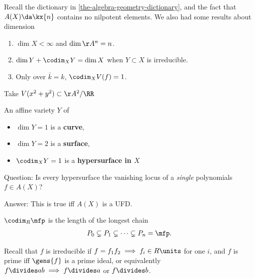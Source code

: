 Recall the dictionary in \cref{the-algebra-geometry-dictionary}, and the
fact that \(A(X) \da \kx{n}\) contains no nilpotent elements. We also
had some results about dimension

\begin{enumerate}
\def\labelenumi{\arabic{enumi}.}
\tightlist
\item
  \(\dim X<\infty\) and \(\dim \AA^n = n\).
\item
  \(\dim Y + \codim_X Y = \dim X\) when \(Y\subset X\) is irreducible.
\item
  Only over \(\bar k = k\), \(\codim_X V(f) = 1\).
\end{enumerate}

\begin{example}

Take \(V(x^2+y^2) \subset \AA^2/\RR\)

\end{example}

\begin{definition}

An affine variety \(Y\) of

\begin{itemize}
\tightlist
\item
  \(\dim Y = 1\) is a \textbf{curve},
\item
  \(\dim Y = 2\) is a \textbf{surface},
\item
  \(\codim_X Y = 1\) is a \textbf{hypersurface in \(X\)}
\end{itemize}

\end{definition}

Question: Is every hypersurface the vanishing locus of a \emph{single}
polynomials \(f\in A(X)\)?

Answer: This is true iff \(A(X)\) is a UFD.

\begin{definition}

\(\codim_R \mfp\) is the length of the longest chain
\begin{align*}P_0 \subsetneq P_1 \subsetneq \cdots \subsetneq P_n = \mfp.\end{align*}

\end{definition}

Recall that \(f\) is irreducible if
\(f = f_1 f_2 \implies f_i \in R\units\) for one \(i\), and \(f\) is
prime iff \(\gens{f}\) is a prime ideal, or equivalently
\(f\divides ab \implies f\divides a\) or \(f\divides b\).

